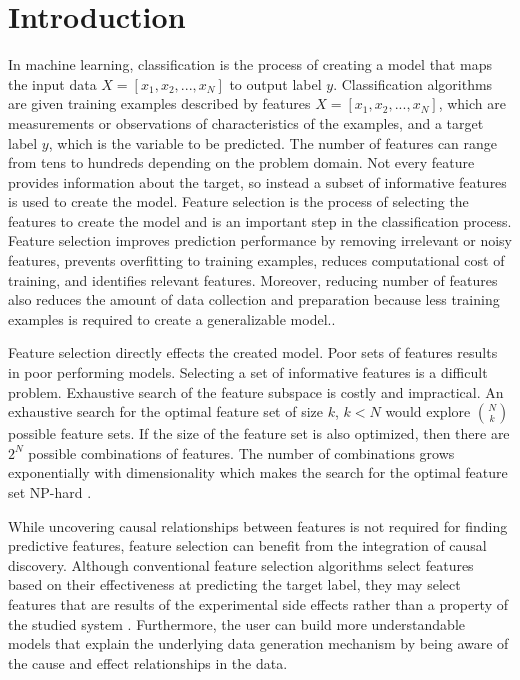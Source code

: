 \chapter{Introduction}
In machine learning, classification is the process of creating a model that maps the input data \(X=[x_1, x_2, ..., x_N]\) to output label \(y\). Classification algorithms are given training examples described by features \(X=[x_1, x_2, ..., x_N]\), which are measurements or observations of characteristics of the examples, and a target label \(y\), which is the variable to be predicted. The number of features can range from tens to hundreds depending on the problem domain. Not every feature provides information about the target, so instead a subset of informative features is used to create the model. Feature selection is the process of selecting the features to create the model and is an important step in the classification process. Feature selection improves prediction performance by removing irrelevant or noisy features, prevents overfitting to training examples, reduces computational cost of training, and identifies relevant features. Moreover, reducing number of features also reduces the amount of data collection and preparation because less training examples is required to create a generalizable model.\cite{ReviewOfFS,  IntroToFS}.

Feature selection directly effects the created model. Poor sets of features results in poor performing models. Selecting a set of informative features is a difficult problem. Exhaustive search of the feature subspace is costly and impractical. An exhaustive search for the optimal feature set of size \(k\), \(k < N\) would explore \(N\choose k\) possible feature sets. If the size of the feature set is also optimized, then there are \(2^N\) possible combinations of features. The number of combinations grows exponentially with dimensionality which makes the search for the optimal feature set NP-hard \cite{IntroToFS}.

While uncovering causal relationships between features is not required for finding predictive features, feature selection can benefit from the integration of causal discovery. Although conventional feature selection algorithms select features based on their effectiveness at predicting the target label, they may select features that are results of the experimental side effects rather than a property of the studied system \cite{CausalFS}. Furthermore, the user can build more understandable models that explain the underlying data generation mechanism by being aware of the cause and effect relationships in the data. 

